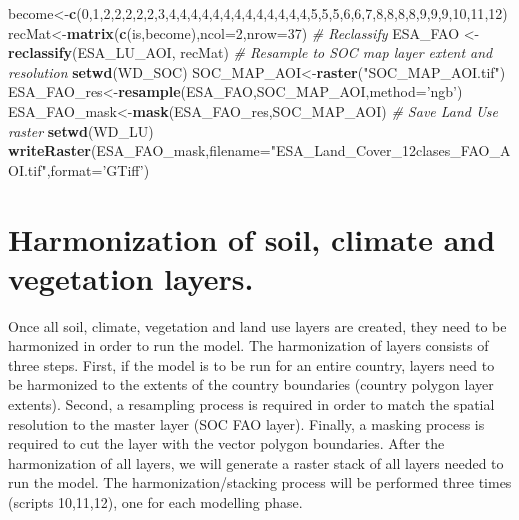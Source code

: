 \documentclass[
  10pt,
  b5paper,
]{book}
\newenvironment{Shaded}{\begin{snugshade}}{\end{snugshade}}
\newcommand{\CommentTok}[1]{\textcolor[rgb]{0.56,0.35,0.01}{\textit{#1}}}
\newcommand{\DataTypeTok}[1]{\textcolor[rgb]{0.13,0.29,0.53}{#1}}
\newcommand{\DecValTok}[1]{\textcolor[rgb]{0.00,0.00,0.81}{#1}}
\newcommand{\KeywordTok}[1]{\textcolor[rgb]{0.13,0.29,0.53}{\textbf{#1}}}
\newcommand{\NormalTok}[1]{#1}
\newcommand{\StringTok}[1]{\textcolor[rgb]{0.31,0.60,0.02}{#1}}
\begin{document}
\begin{Shaded}
\begin{Highlighting}[]
\NormalTok{become<-}\KeywordTok{c}\NormalTok{(}\DecValTok{0}\NormalTok{,}\DecValTok{1}\NormalTok{,}\DecValTok{2}\NormalTok{,}\DecValTok{2}\NormalTok{,}\DecValTok{2}\NormalTok{,}\DecValTok{2}\NormalTok{,}\DecValTok{2}\NormalTok{,}\DecValTok{3}\NormalTok{,}\DecValTok{4}\NormalTok{,}\DecValTok{4}\NormalTok{,}\DecValTok{4}\NormalTok{,}\DecValTok{4}\NormalTok{,}\DecValTok{4}\NormalTok{,}\DecValTok{4}\NormalTok{,}\DecValTok{4}\NormalTok{,}\DecValTok{4}\NormalTok{,}\DecValTok{4}\NormalTok{,}\DecValTok{4}\NormalTok{,}\DecValTok{4}\NormalTok{,}\DecValTok{4}\NormalTok{,}\DecValTok{4}\NormalTok{,}\DecValTok{5}\NormalTok{,}\DecValTok{5}\NormalTok{,}\DecValTok{5}\NormalTok{,}\DecValTok{6}\NormalTok{,}\DecValTok{6}\NormalTok{,}\DecValTok{7}\NormalTok{,}\DecValTok{8}\NormalTok{,}\DecValTok{8}\NormalTok{,}\DecValTok{8}\NormalTok{,}\DecValTok{8}\NormalTok{,}\DecValTok{9}\NormalTok{,}\DecValTok{9}\NormalTok{,}\DecValTok{9}\NormalTok{,}\DecValTok{10}\NormalTok{,}\DecValTok{11}\NormalTok{,}\DecValTok{12}\NormalTok{)}
\NormalTok{recMat<-}\KeywordTok{matrix}\NormalTok{(}\KeywordTok{c}\NormalTok{(is,become),}\DataTypeTok{ncol=}\DecValTok{2}\NormalTok{,}\DataTypeTok{nrow=}\DecValTok{37}\NormalTok{)}
\CommentTok{# Reclassify}
\NormalTok{ESA_FAO <-}\StringTok{ }\KeywordTok{reclassify}\NormalTok{(ESA_LU_AOI, recMat)}
\CommentTok{# Resample to SOC map layer extent and resolution}
\KeywordTok{setwd}\NormalTok{(WD_SOC)}
\NormalTok{SOC_MAP_AOI<-}\KeywordTok{raster}\NormalTok{(}\StringTok{"SOC_MAP_AOI.tif"}\NormalTok{)}
\NormalTok{ESA_FAO_res<-}\KeywordTok{resample}\NormalTok{(ESA_FAO,SOC_MAP_AOI,}\DataTypeTok{method=}\StringTok{'ngb'}\NormalTok{) }
\NormalTok{ESA_FAO_mask<-}\KeywordTok{mask}\NormalTok{(ESA_FAO_res,SOC_MAP_AOI) }
\CommentTok{# Save Land Use raster}
\KeywordTok{setwd}\NormalTok{(WD_LU)}
\KeywordTok{writeRaster}\NormalTok{(ESA_FAO_mask,}\DataTypeTok{filename=}\StringTok{"ESA_Land_Cover_12clases_FAO_AOI.tif"}\NormalTok{,}\DataTypeTok{format=}\StringTok{'GTiff'}\NormalTok{)}
\end{Highlighting}
\end{Shaded}

\hypertarget{harmonization-of-soil-climate-and-vegetation-layers.}{%
\section{Harmonization of soil, climate and vegetation layers.}\label{harmonization-of-soil-climate-and-vegetation-layers.}}

Once all soil, climate, vegetation and land use layers are created, they need to be harmonized in order to run the model. The harmonization of layers consists of three steps. First, if the model is to be run for an entire country, layers need to be harmonized to the extents of the country boundaries (country polygon layer extents). Second, a resampling process is required in order to match the spatial resolution to the master layer (SOC FAO layer). Finally, a masking process is required to cut the layer with the vector polygon boundaries. After the harmonization of all layers, we will generate a raster stack of all layers needed to run the model. The harmonization/stacking process will be performed three times (scripts 10,11,12), one for each modelling phase.
\end{document}
